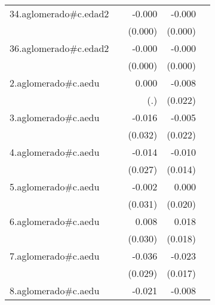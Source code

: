 {\begin{longtable}{l*{4}{D{.}{.}{-1}}}
\addlinespace
34.aglomerado#c.edad2&                     &      -0.000         &      -0.000\sym{*}  &                     \\
            &                     &     (0.000)         &     (0.000)         &                     \\
\addlinespace
36.aglomerado#c.edad2&                     &      -0.000         &      -0.000\sym{**} &                     \\
            &                     &     (0.000)         &     (0.000)         &                     \\
\addlinespace
2.aglomerado#c.aedu&                     &       0.000         &      -0.008         &                     \\
            &                     &         (.)         &     (0.022)         &                     \\
\addlinespace
3.aglomerado#c.aedu&                     &      -0.016         &      -0.005         &                     \\
            &                     &     (0.032)         &     (0.022)         &                     \\
\addlinespace
4.aglomerado#c.aedu&                     &      -0.014         &      -0.010         &                     \\
            &                     &     (0.027)         &     (0.014)         &                     \\
\addlinespace
5.aglomerado#c.aedu&                     &      -0.002         &       0.000         &                     \\
            &                     &     (0.031)         &     (0.020)         &                     \\
\addlinespace
6.aglomerado#c.aedu&                     &       0.008         &       0.018         &                     \\
            &                     &     (0.030)         &     (0.018)         &                     \\
\addlinespace
7.aglomerado#c.aedu&                     &      -0.036         &      -0.023         &                     \\
            &                     &     (0.029)         &     (0.017)         &                     \\
\addlinespace
8.aglomerado#c.aedu&                     &      -0.021         &      -0.008         &                     \\

\end{longtable}}
